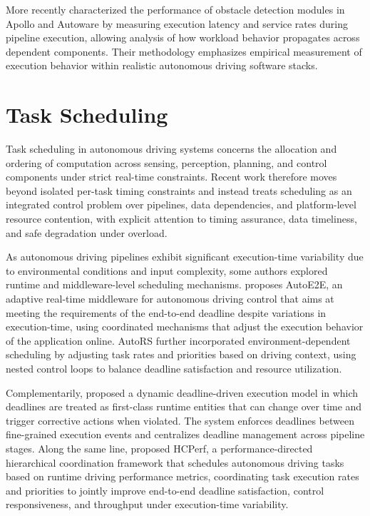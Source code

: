 More recently  characterized the performance of obstacle detection modules in Apollo and Autoware by measuring execution latency and service rates during pipeline execution, allowing analysis of how workload behavior propagates across dependent components. Their methodology emphasizes empirical measurement of execution behavior within realistic autonomous driving software stacks.

\section {Task Scheduling}
Task scheduling in autonomous driving systems concerns the allocation and ordering of computation across sensing, perception, planning, and control components under strict real-time constraints. Recent work therefore moves beyond isolated per-task timing constraints and instead treats scheduling as an integrated control problem over pipelines, data dependencies, and platform-level resource contention, with explicit attention to timing assurance, data timeliness, and safe degradation under overload.

As autonomous driving pipelines exhibit significant execution-time variability due to environmental conditions and input complexity, some authors explored runtime and middleware-level scheduling mechanisms.  proposes AutoE2E, an adaptive real-time middleware for autonomous driving control that aims at meeting the requirements of the end-to-end deadline despite variations in execution-time, using coordinated mechanisms that adjust the execution behavior of the application online. AutoRS \cite{Ma2023} further incorporated environment-dependent scheduling by adjusting task rates and priorities based on driving context, using nested control loops to balance deadline satisfaction and resource utilization.

Complementarily,  proposed a dynamic deadline-driven execution model in which deadlines are treated as first-class runtime entities that can change over time and trigger corrective actions when violated. The system enforces deadlines between fine-grained execution events and centralizes deadline management across pipeline stages. Along the same line,  proposed HCPerf, a performance-directed hierarchical coordination framework that schedules autonomous driving tasks based on runtime driving performance metrics, coordinating task execution rates and priorities to jointly improve end-to-end deadline satisfaction, control responsiveness, and throughput under execution-time variability.

